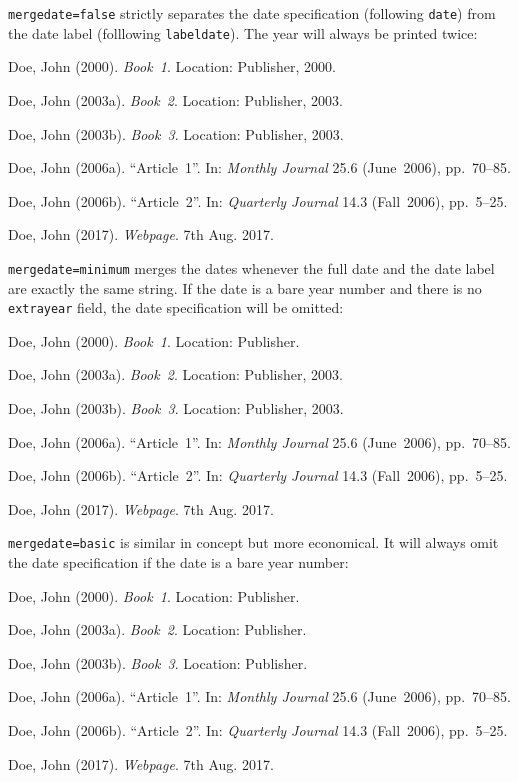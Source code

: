 \documentclass[a4paper]{article}
\newenvironment{bibsample}
  {\trivlist\samepage
   \setlength{\itemsep}{0pt}}
  {\endtrivlist}
\begin{document}
\texttt{mergedate=false} strictly separates the date specification
(following \texttt{date}) from the date label (folllowing \texttt{labeldate}).
The year will always be printed twice:

\begin{bibsample}
\item Doe, John (2000). \emph{Book~1}. Location: Publisher, 2000.
\item Doe, John (2003a). \emph{Book~2}. Location: Publisher, 2003.
\item Doe, John (2003b). \emph{Book~3}. Location: Publisher, 2003.
\item Doe, John (2006a). \enquote{Article~1}. In: \emph{Monthly Journal} 25.6
(June~2006), pp.~70--85.
\item Doe, John (2006b). \enquote{Article~2}. In: \emph{Quarterly Journal} 14.3
(Fall~2006), pp.~5--25.
\item Doe, John (2017). \emph{Webpage}. 7th Aug. 2017.
\end{bibsample}

\texttt{mergedate=minimum} merges the dates whenever the full date
and the date label are exactly the same string. If the date is a bare
year number and there is no \texttt{extrayear} field, the date
specification will be omitted:

\begin{bibsample}
\item Doe, John (2000). \emph{Book~1}. Location: Publisher.
\item Doe, John (2003a). \emph{Book~2}. Location: Publisher, 2003.
\item Doe, John (2003b). \emph{Book~3}. Location: Publisher, 2003.
\item Doe, John (2006a). \enquote{Article~1}. In: \emph{Monthly Journal} 25.6
(June~2006), pp.~70--85.
\item Doe, John (2006b). \enquote{Article~2}. In: \emph{Quarterly Journal} 14.3
(Fall~2006), pp.~5--25.
\item Doe, John (2017). \emph{Webpage}. 7th Aug. 2017.
\end{bibsample}

\texttt{mergedate=basic} is similar in concept but more economical.
It will always omit the date specification if the date is a bare year
number:

\begin{bibsample}
\item Doe, John (2000). \emph{Book~1}. Location: Publisher.
\item Doe, John (2003a). \emph{Book~2}. Location: Publisher.
\item Doe, John (2003b). \emph{Book~3}. Location: Publisher.
\item Doe, John (2006a). \enquote{Article~1}. In: \emph{Monthly Journal} 25.6
(June~2006), pp.~70--85.
\item Doe, John (2006b). \enquote{Article~2}. In: \emph{Quarterly Journal} 14.3
(Fall~2006), pp.~5--25.
\item Doe, John (2017). \emph{Webpage}. 7th Aug. 2017.
\end{bibsample}
\end{document}

